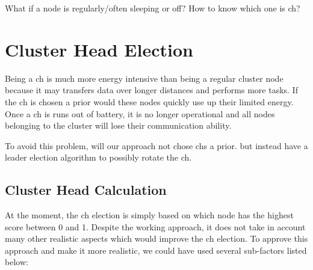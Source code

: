 \documentclass[USenglish]{uit-thesis}
\begin{document}



What if a node is regularly/often sleeping or off? How to know which one is \gls{ch}?



\section{Cluster Head Election}


Being a \gls{ch} is much more energy intensive than being a regular cluster node because it may transfers data over longer distances and performs more tasks. If the \gls{ch} is chosen a prior would these nodes quickly use up their limited energy. Once a \gls{ch} is runs out of battery, it is no longer operational and all nodes belonging to the cluster will lose their communication ability.

To avoid this problem, will our approach not chose \gls{ch}s a prior. but instead have a leader election algorithm to possibly rotate the \gls{ch}.


\subsection{Cluster Head Calculation} \label{disc:ch_election}
At the moment, the \gls{ch} election is simply based on which node has the highest score between 0 and 1. Despite the working approach, it does not take in account many other realistic aspects which would improve the \gls{ch} election. To approve this approach and make it more realistic, we could have used several sub-factors listed below:
\end{document}
